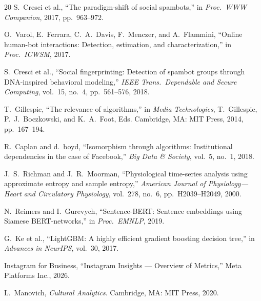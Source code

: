 \documentclass[conference]{IEEEtran}
\begin{document}
\begin{thebibliography}{20}
S.~Cresci et al.,
``The paradigm-shift of social spambots,''
in \emph{Proc.\ WWW Companion}, 2017, pp.~963--972.

O.~Varol, E.~Ferrara, C.~A.~Davis, F.~Menczer, and A.~Flammini,
``Online human-bot interactions: Detection, estimation, and characterization,''
in \emph{Proc.\ ICWSM}, 2017.

S.~Cresci et al.,
``Social fingerprinting: Detection of spambot groups through DNA-inspired
behavioral modeling,''
\emph{IEEE Trans.\ Dependable and Secure Computing}, vol.~15, no.~4, pp.~561--576, 2018.

T.~Gillespie,
``The relevance of algorithms,''
in \emph{Media Technologies}, T.~Gillespie, P.~J.~Boczkowski, and K.~A.~Foot, Eds.
Cambridge, MA: MIT Press, 2014, pp.~167--194.

R.~Caplan and d.~boyd,
``Isomorphism through algorithms: Institutional dependencies in the case of Facebook,''
\emph{Big Data \& Society}, vol.~5, no.~1, 2018.

J.~S.~Richman and J.~R.~Moorman,
``Physiological time-series analysis using approximate entropy and sample entropy,''
\emph{American Journal of Physiology---Heart and Circulatory Physiology},
vol.~278, no.~6, pp.~H2039--H2049, 2000.

N.~Reimers and I.~Gurevych,
``Sentence-BERT: Sentence embeddings using Siamese BERT-networks,''
in \emph{Proc.\ EMNLP}, 2019.

G.~Ke et al.,
``LightGBM: A highly efficient gradient boosting decision tree,''
in \emph{Advances in NeurIPS}, vol.~30, 2017.

Instagram for Business,
``Instagram Insights --- Overview of Metrics,''
Meta Platforms Inc., 2026.

L.~Manovich,
\emph{Cultural Analytics}.
Cambridge, MA: MIT Press, 2020.

\end{thebibliography}
\end{document}
